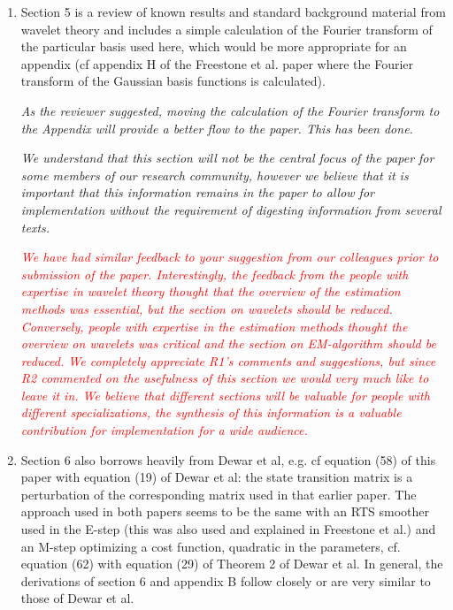 \documentclass{article}
\newcommand{\dean}[1]{\textcolor{red}{#1}}
\newcommand{\parham}[1]{\textcolor{blue}{#1}}
\begin{document}
\begin{enumerate}
        \item Section 5 is a review of known results and standard background material from wavelet theory and includes a simple calculation of the Fourier transform of the particular basis used here, which would be more appropriate for an appendix (cf appendix H of the Freestone et al. paper where the Fourier transform of the Gaussian basis functions is calculated).


\emph{As the reviewer suggested, moving the calculation of the Fourier transform to the Appendix will provide a better flow to the paper. This has been done.}

\emph{We understand that this section will not be the central focus of the paper for some members of our research community, however we believe that it is important that this information remains in the paper to allow for implementation without the requirement of digesting information from several texts.} 

\emph{\dean{We have had similar feedback to your suggestion from our colleagues prior to submission of the paper. Interestingly, the feedback from the people with expertise in wavelet theory thought that the overview of the estimation methods was essential, but the section on wavelets should be reduced. Conversely, people with expertise in the estimation methods thought the overview on wavelets was critical and the section on EM-algorithm should be reduced. We completely appreciate R1's comments and suggestions, but since R2 commented on the usefulness of this section we would very much like to leave it in. We believe that different sections will be valuable for people with different specializations, the synthesis of this information is a valuable contribution for implementation for a wide audience.}}

        \item Section 6 also borrows heavily from Dewar et al, e.g. cf equation (58) of this paper with equation (19) of Dewar et al: the state transition matrix is a perturbation of the corresponding matrix used in that earlier paper. The approach used in both papers seems to be the same with an RTS smoother used in the E-step (this was also used and explained in Freestone et al.) and an M-step optimizing a cost function, quadratic in the parameters, cf. equation (62) with equation (29) of Theorem 2 of Dewar et al. In general, the derivations of section 6 and appendix B follow closely or are very similar to those of Dewar et al.


\end{enumerate}
\end{document}
